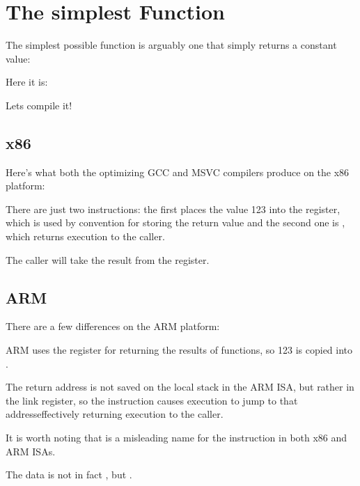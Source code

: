 \chapter{The simplest Function}

The simplest possible function is arguably one that simply returns a constant value:

Here it is:



Lets compile it!

\section{x86}

Here's what both the optimizing GCC and MSVC compilers produce on the x86 platform:



There are just two instructions: the first places the value 123 into the \EAX register, 
which is used by convention for storing the return
value and the second one is \RET, which returns execution to the \gls{caller}.

The caller will take the result from the \EAX register.

\section{ARM}

There are a few differences on the ARM platform:



ARM uses the register  for returning the results of functions, so 123 is copied into .

The return address is not saved on the local stack in the ARM \ac{ISA}, but rather in the link register, 
so the  instruction causes execution to jump to that address\EMDASH{}effectively returning execution to the \gls{caller}.

It is worth noting that \MOV is a misleading name for the instruction in both x86 and ARM \ac{ISA}s.

The data is not in fact , but .

